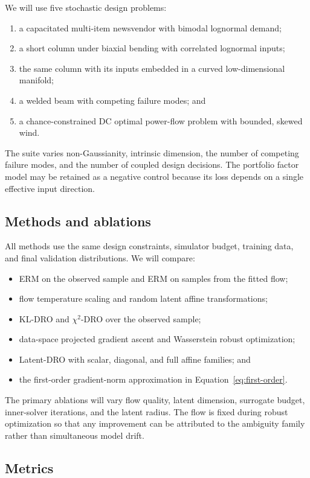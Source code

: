 \documentclass[11pt]{article}
\begin{document}
We will use five stochastic design problems:
\begin{enumerate}
  \item a capacitated multi-item newsvendor with bimodal lognormal demand;
  \item a short column under biaxial bending with correlated lognormal inputs;
  \item the same column with its inputs embedded in a curved low-dimensional manifold;
  \item a welded beam with competing failure modes; and
  \item a chance-constrained DC optimal power-flow problem with bounded, skewed wind.
\end{enumerate}
The suite varies non-Gaussianity, intrinsic dimension, the number of competing failure modes,
and the number of coupled design decisions. The portfolio factor model may be retained as a
negative control because its loss depends on a single effective input direction.

\subsection{Methods and ablations}

All methods use the same design constraints, simulator budget, training data, and final
validation distributions. We will compare:
\begin{itemize}
  \item ERM on the observed sample and ERM on samples from the fitted flow;
  \item flow temperature scaling and random latent affine transformations;
  \item KL-DRO and $\chi^2$-DRO over the observed sample;
  \item data-space projected gradient ascent and Wasserstein robust optimization;
  \item Latent-DRO with scalar, diagonal, and full affine families; and
  \item the first-order gradient-norm approximation in Equation~\ref{eq:first-order}.
\end{itemize}
The primary ablations will vary flow quality, latent dimension, surrogate budget, inner-solver
iterations, and the latent radius. The flow is fixed during robust optimization so that any
improvement can be attributed to the ambiguity family rather than simultaneous model drift.

\subsection{Metrics}
\end{document}

